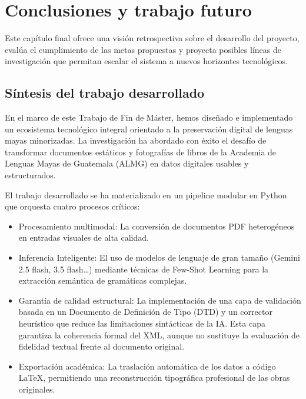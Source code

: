 \chapter{Conclusiones y trabajo futuro}

Este capítulo final ofrece una visión retrospectiva sobre el desarrollo del proyecto, evalúa el cumplimiento de las metas propuestas y proyecta posibles líneas de investigación que permitan escalar el sistema a nuevos horizontes tecnológicos.

\section{Síntesis del trabajo desarrollado}

En el marco de este Trabajo de Fin de Máster, hemos diseñado e implementado un ecosistema tecnológico integral orientado a la preservación digital de lenguas mayas minorizadas. La investigación ha abordado con éxito el desafío de transformar documentos estáticos y fotografías de libros de la Academia de Lenguas Mayas de Guatemala (ALMG) en datos digitales usables y estructurados.

El trabajo desarrollado se ha materializado en un pipeline modular en Python que orquesta cuatro procesos críticos:

\begin{itemize}
    \item Procesamiento multimodal: La conversión de documentos PDF heterogéneos en entradas visuales de alta calidad.
    
    \item Inferencia Inteligente: El uso de modelos de lenguaje de gran tamaño (Gemini 2.5 flash, 3.5 flash…) mediante técnicas de Few-Shot Learning para la extracción semántica de gramáticas complejas.
    
        \item Garantía de calidad estructural: La implementación de una capa de validación basada en un Documento de Definición de Tipo (DTD) y un corrector heurístico que reduce las limitaciones sintácticas de la IA. Esta capa garantiza la coherencia formal del XML, aunque no sustituye la evaluación de fidelidad textual frente al documento original.
    
    \item Exportación académica: La traslación automática de los datos a código LaTeX, permitiendo una reconstrucción tipográfica profesional de las obras originales.
\end{itemize}

